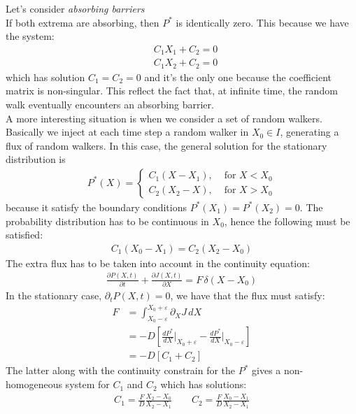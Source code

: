 \documentclass[4apaper,11pt,fleqn]{article}
\theoremstyle{remark}
\theoremstyle{definition}
\begin{document}
Let's consider \emph{absorbing barriers}\\
If both extrema are absorbing, then $P^*$ is identically zero. This because we have the system:
\begin{align*}
  &C_1 X_1 + C_2 = 0 \\
  &C_1 X_2 + C_2 = 0
\end{align*}
which has solution $C_1 = C_2 = 0$ and it's the only one because the coefficient matrix is non-singular. This reflect the fact that, at infinite time, the random walk eventually encounters an absorbing barrier. \\
A more interesting situation is when we consider a set of random walkers. Basically we inject at each time step a random walker in $X_0 \in I$, generating a flux of random walkers.
In this case, the general solution for the stationary distribution is
\begin{align*}
  P^{*}(X)=\left\{\begin{array}{ll}{C_{1}\left(X-X_{1}\right),} & {\text { for } X<X_{0}} \\
  {C_{2}\left(X_{2}-X\right),} & {\text { for } X>X_{0}}\end{array}\right. %
\end{align*}
because it satisfy the boundary conditions $P^*(X_1)=P^*(X_2)=0$. The probability distribution has to be continuous in $X_0$, hence the following must be satisfied:
\begin{align*}
  C_{1}\left(X_{0}-X_{1}\right)=C_{2}\left(X_{2}-X_{0}\right)
\end{align*}
The extra flux has to be taken into account in the continuity equation:
\begin{align*}
  \frac{\partial P(X, t)}{\partial t}+\frac{\partial J(X, t)}{\partial X}= F \, \delta (X - X_0)
\end{align*}
In the stationary case, $\partial_t P(X,t) = 0$, we have that the flux must satisfy:
\begin{align*}
  F &= \int_{X_0 - \varepsilon}^{X_0 + \varepsilon} \partial_X J \, dX  \\
    &= -D \left[ \frac{d P^*}{dX}\Bigr|_{X_0 + \varepsilon} - \frac{d P^*}{dX}\Bigr|_{X_0 - \varepsilon} \right] \\
    &= -D [C_1 + C_2]
\end{align*}
The latter along with the continuity constrain for the $P^*$ gives a non-homogeneous system for $C_1$ and $C_2$ which has solutions:
\begin{align*}
  C_1 = \frac{F}{D} \frac{X_2 - X_0}{X_2 - X_1} \qquad C_2 = \frac{F}{D} \frac{X_0 - X_1}{X_2 - X_1}
\end{align*}
\end{document}
